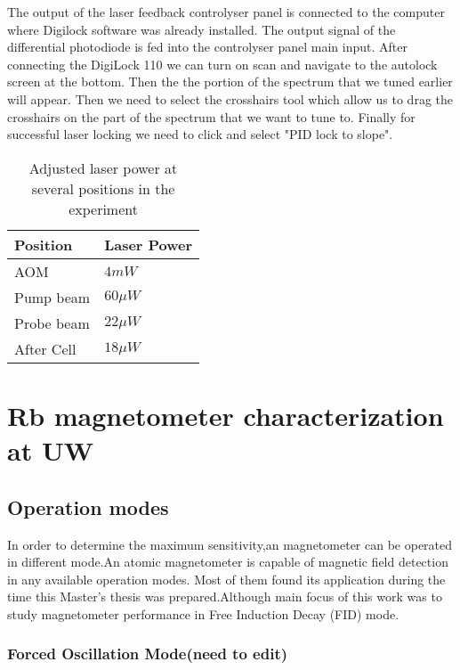 \documentclass[12pt]{report}
\begin{document}
The output of the laser feedback controlyser panel is connected to the computer where Digilock software was already installed. The output signal of the differential photodiode is fed into the controlyser panel main input. After connecting the DigiLock 110 we can turn on scan and navigate to the autolock screen at the bottom. Then the the portion of the spectrum that we tuned earlier will appear. Then we need to select the crosshairs tool which allow us to drag the crosshairs on the part of the spectrum that we want to tune to. Finally for successful laser locking we need to click and select "PID lock to slope".
\begin{table}[h]
\centering
\begin{tabular}{|l | l|}
\hline

\textbf{ Position}    & \textbf{Laser Power} \\
\hline

AOM &   $4mW$  \\

Pump beam   &    $60\mu W$  \\

Probe beam   &    $22\mu W$  \\
After Cell  &      $18\mu W$   \\

\hline
\end{tabular}
\caption{Adjusted laser power at several positions in the experiment}
\end{table}

\chapter{Rb magnetometer characterization at UW}
\section{Operation modes}

 In order to determine the maximum sensitivity,an magnetometer can be operated in different mode.An atomic
magnetometer is capable of magnetic field detection in any available operation modes. Most of them found its application during the time this Master's thesis was prepared.Although main focus of this work was to study magnetometer performance in Free Induction Decay (FID) mode.
 \subsection{Forced Oscillation Mode(need to edit)}
\end{document}
